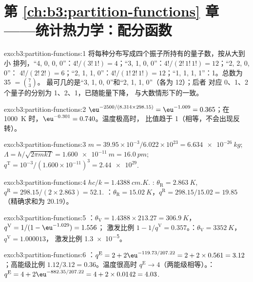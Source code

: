 \section*{第 \ref{ch:b3:partition-functions} 章——统计热力学：配分函数}

\begin{solution}{exo:b3:partition-functions:1}
将每种分布写成四个振子所持有的量子数，按从大到小
排列，“4, 0, 0, 0”：$4!/(3!\,1!) = 4$；“3, 1, 0, 0”：$4!/(2!\,1!\,1!) = 12$；“2, 2, 0, 0”：
$4!/(2!\,2!) = 6$；“2, 1, 1, 0”：$4!/(1!\,2!\,1!) = 12$；“1, 1, 1, 1”：1。总数为 35 $= \binom73$。
最可几的是“3, 1, 0, 0”和“2, 1, 1, 0”（各为 12）；后者
对应 0、1、2 个量子的分别为 1、2、1，已随能量下降，
与大数情形下的一致。
\end{solution}

\begin{solution}{exo:b3:partition-functions:2}
$\eu^{-2500/(8.314 \times 298.15)} = \eu^{-1.009} = 0.365$；在 \qty{1000}{K} 时，$\eu^{-0.301} = 0.740$。温度极高时，
比值趋于 1（相等，不会出现反转）。
\end{solution}

\begin{solution}{exo:b3:partition-functions:3}
$m = 39.95\times10^{-3}/6.022\times10^{23} = \qty{6.634e-26}{kg}$; $\Lambda = h/\sqrt{2\pi mkT} =
\qty{1.600e-11}{m} = \qty{16.0}{pm}$; $q^{\mathrm T} = 10^{-3}/(1.600\times10^{-11})^3 = \num{2.44e29}$.
\end{solution}

\begin{solution}{exo:b3:partition-functions:4}
$hc/k = \qty{1.4388}{cm.K}$. : $\theta_{\mathrm R} = \qty{2.863}{K}$, $q^{\mathrm R} = 298.15/(2 \times 2.863) = 52.1$.
：$\theta_{\mathrm R} = \qty{15.02}{K}$，$q^{\mathrm R} = 298.15/15.02 = 19.85$（精确求和为 20.19）。
\end{solution}

\begin{solution}{exo:b3:partition-functions:5}
：$\theta_{\mathrm V} = 1.4388 \times 213.27 = \qty{306.9}{K}$，$q^{\mathrm V} = 1/(1 - \eu^{-1.029}) = 1.556$；
激发比例 $1 - 1/q^{\mathrm V} = 0.357$。：$\theta_{\mathrm V} = \qty{3352}{K}$，$q^{\mathrm V} = 1.000013$，
激发比例 \num{1.3e-5}。
\end{solution}

\begin{solution}{exo:b3:partition-functions:6}
：$q^{\mathrm E} = 2 + 2\eu^{-119.73/207.22} = 2 + 2 \times 0.561 = 3.12$；高能级比例 $1.12/3.12
= 0.36$。温度很高时 $q^{\mathrm E} \to 4$（两能级相等）。：
$q^{\mathrm E} = 4 + 2\eu^{-882.35/207.22} = 4 + 2 \times 0.0142 = 4.03$.
\end{solution}

